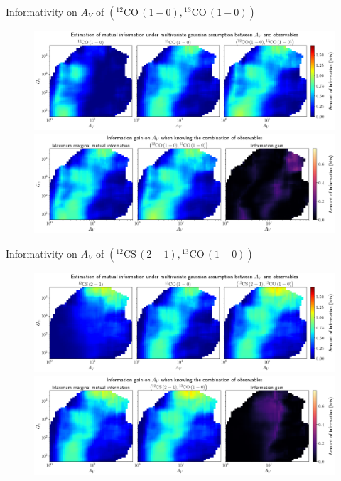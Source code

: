 \documentclass{beamer}
\begin{document}
\begin{frame}{Informativity on $A_V$ of $\left(\mathrm{^{12}CO\,(1-0)},\mathrm{^{13}CO\,(1-0)}\right)$}
    \begin{figure}
        \centering
        \includegraphics[width=0.95\linewidth]{../linearinfogauss/av__12co10_13co10_linearinfogauss.png}
        \vfill
        \includegraphics[width=0.95\linewidth]{../linearinfogauss/av__12co10_13co10_linearinfogauss_gain.png}
    \end{figure}
\end{frame}

\begin{frame}{Informativity on $A_V$ of $\left(\mathrm{^{12}CS\,(2-1)},\mathrm{^{13}CO\,(1-0)}\right)$}
    \begin{figure}
        \centering
        \includegraphics[width=0.95\linewidth]{../linearinfogauss/av__12cs21_13co10_linearinfogauss.png}
        \vfill
        \includegraphics[width=0.95\linewidth]{../linearinfogauss/av__12cs21_13co10_linearinfogauss_gain.png}
    \end{figure}
\end{frame}
\end{document}
